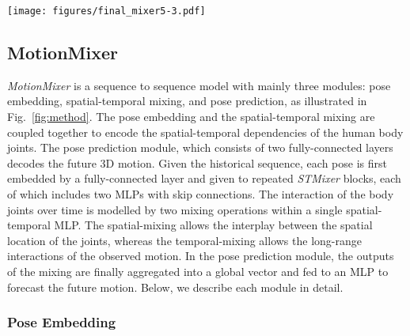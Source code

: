 \documentclass{article}
\begin{document}
\begin{figure*}[ht!]
    \centering
    \texttt{[image: figures/final\_mixer5-3.pdf]} 
    \caption{\textbf{Overview of the proposed MotionMixer}. It mainly consists of three modules: pose embedding, spatial-temporal mixing, and pose prediction. First, the pose embedding module linearly projects each of the past 3D body poses through a single fully-connected layer to a hidden dimension . The learned features are then fed to  \textit{STMixer} layers. Equipped with a spatial-MLP, a temporal-MLP and a squeeze-and-excitation (SE) block, \textit{STMixer} aims to learn fine-grained spatial-temporal dependencies of the human motion. The mixing blocks are shown on the right. In each layer, we depict how our framework aggregates information via spatial-temporal mixing. An MLP-based body pose prediction is then applied to the mixed features to forecast the future human motion.}
    \label{fig:method}
\end{figure*}

\subsection{MotionMixer}
\textit{MotionMixer} is a sequence to sequence model with mainly three modules: pose embedding, spatial-temporal mixing, and pose prediction, as illustrated in Fig.~\ref{fig:method}. The pose embedding and the spatial-temporal mixing are coupled together to encode the spatial-temporal dependencies of the human body joints. The pose prediction module, which consists of two fully-connected layers decodes the future 3D motion. Given the historical sequence, each pose is first embedded by a fully-connected layer and given to repeated  \textit{STMixer} blocks, each of which includes two MLPs with skip connections. The interaction of the body joints over time is modelled by two mixing operations within a single spatial-temporal MLP. The spatial-mixing allows the interplay between the spatial location of the joints, whereas the temporal-mixing allows the long-range interactions of the observed motion. In the pose prediction module, the outputs of the mixing are finally aggregated into a global vector and fed to an MLP to forecast the future motion. Below, we describe each module in detail.

\subsubsection{Pose Embedding} 
\end{document}
